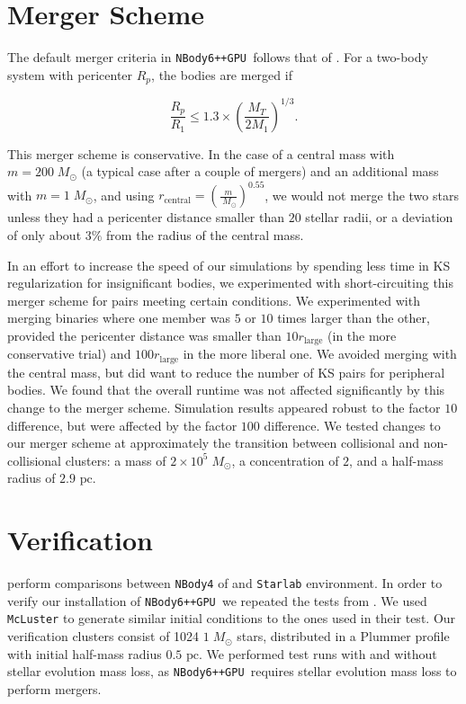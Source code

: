 \documentclass{princeton_astro_thesis}
\newcommand\Msun{\; M_\odot}
\newcommand\pc{\mbox{ pc}}
\newcommand\nbody{\texttt{NBody6++GPU }}
\numberwithin{equation}{section}
\begin{document}
\section{Merger Scheme}
The default merger criteria in \nbody follows that of \citet{1992Kochanek}.  For a two-body system with pericenter $R_p$, the bodies are merged if

\begin{equation}
 \frac{R_{p}}{R_{1}} \leq 1.3 \times (\frac{M_T}{2M_1})^{1/3}.
 \label{eqn:kochanekcriteria}
\end{equation}

This merger scheme is conservative.  In the case of a central mass with $m = 200 \Msun$ (a typical case after a couple of mergers) and an additional mass with $m = 1 \Msun$, and using $r_{\mathrm{central}} = (\frac{m}{\Msun})^{0.55}$, we would not merge the two stars unless they had a pericenter distance smaller than $20$ stellar radii, or a deviation of only about $3\%$ from the radius of the central mass.

In an effort to increase the speed of our simulations by spending less time in KS regularization for insignificant bodies, we experimented with short-circuiting this merger scheme for pairs meeting certain conditions.  We experimented with merging binaries where one member was $5$ or $10$ times larger than the other, provided the pericenter distance was smaller than $10 r_\mathrm{large}$ (in the more conservative trial) and $100 r_\mathrm{large}$ in the more liberal one.  We avoided merging with the central mass, but did want to reduce the number of KS pairs for peripheral bodies. We found that the overall runtime was not affected significantly by this change to the merger scheme. Simulation results appeared robust to the factor $10$ difference, but were affected by the factor $100$ difference.  We tested changes to our merger scheme at approximately the transition between collisional and non-collisional clusters: a mass of $2 \times 10^5 \Msun$, a concentration of $2$, and a half-mass radius of $2.9 \pc$.

\section{Verification}
\citet{2009Anders, 2012Anders} perform comparisons between \texttt{NBody4} of \citet{1999Aarseth} and \texttt{Starlab} environment.  In order to verify our installation of \nbody we repeated the tests from \citet{2009Anders}.  We used \texttt{McLuster} to generate similar initial conditions to the ones used in their test. Our verification clusters consist of 1024 $1 \Msun$ stars, distributed in a Plummer profile with initial half-mass radius $0.5 \pc$.  We performed test runs with and without stellar evolution mass loss, as \nbody requires stellar evolution mass loss to perform mergers.
\end{document}
